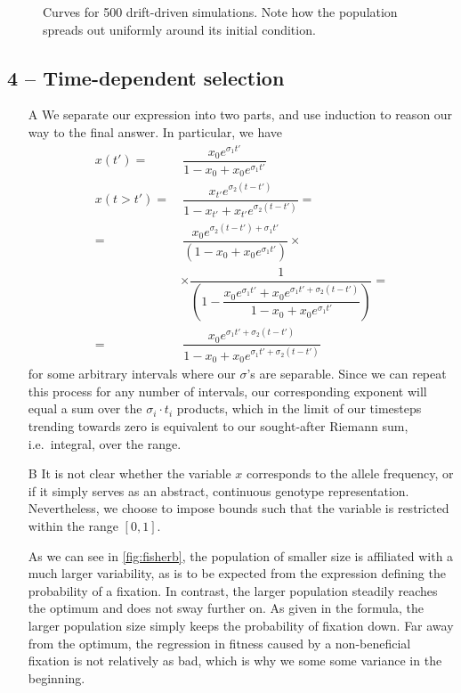 \documentclass[10pt]{article}\usepackage[]{graphicx}\usepackage[]{color}
\theoremstyle{plain}
\begin{document}
\begin{multicols*}{2}
\begin{Schunk}
\begin{figure}[H]
{}

\caption[Curves for 500 drift-driven simulations]{Curves for 500 drift-driven simulations. Note how the population spreads out uniformly around its initial condition.}\label{fig:stochd}
\end{figure}
\end{Schunk}

\subsection*{4 -- Time-dependent selection}
\begin{enumerate}
  \item[A] We separate our expression into two parts, and use induction to reason our way to the final answer. In particular, we have 
  \begin{align*}
  x(t')   =&~\dfrac{x_0e^{\sigma_1t'}}{1 - x_0 + x_0 e^{\sigma_1t'}} \\
  x(t>t') =&~\dfrac{x_{t'}e^{\sigma_2(t-t')}}{1 -  x_{t'} + x_{t'}e^{\sigma_2(t-t')}} = \\
          =&~\dfrac{x_0 e^{\sigma_2(t-t') + \sigma_1t'}}{\left(1 - x_0 + x_0e^{\sigma_1t'}\right)} \times \\
         &\times \dfrac{1}{\left(1 - \dfrac{x_0e^{\sigma_1t'} + x_0e^{\sigma_1t' + \sigma_2(t-t')}}{
            1 - x_0 + x_0e^{\sigma_1t'}}\right)} = \\
          =&~\dfrac{x_0e^{\sigma_1t' + \sigma_2(t-t')}}{1 - x_0 + x_0e^{\sigma_1t' + \sigma_2(t-t')}}
  \end{align*}
  for some arbitrary intervals where our $\sigma$'s are separable. Since we can repeat this process for any number of intervals, our corresponding exponent will equal a sum over the $\sigma_i\cdot t_i$ products, which in the limit of our timesteps trending towards zero is equivalent to our sought-after Riemann sum, i.e.\ integral, over the range.
  \end{enumerate}

\begin{enumerate}
  \item[B] It is not clear whether the variable $x$ corresponds to the allele frequency, or if it simply serves as an abstract, continuous genotype representation. Nevertheless, we choose to impose bounds such that the variable is restricted within the range $[0, 1]$. 
  
  As we can see in \cref{fig:fisherb}, the population of smaller size is affiliated with a much larger variability, as is to be expected from the expression defining the probability of a fixation. In contrast, the larger population steadily reaches the optimum and does not sway further on. As given in the formula, the larger population size simply keeps the probability of fixation down. Far away from the optimum, the regression in fitness caused by a non-beneficial fixation is not relatively as bad, which is why we some some variance in the beginning. 
  

\end{enumerate}
\end{multicols*}
\end{document}
